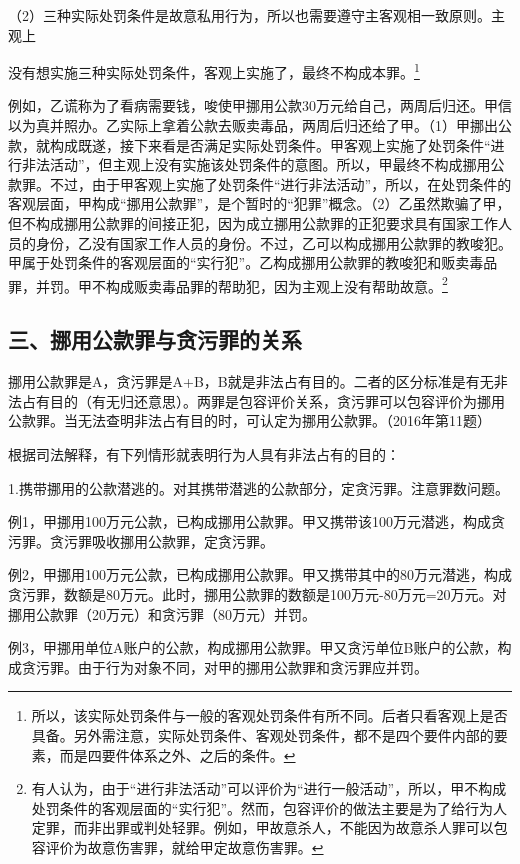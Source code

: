 （2）三种实际处罚条件是故意私用行为，所以也需要遵守主客观相一致原则。主观上

没有想实施三种实际处罚条件，客观上实施了，最终不构成本罪。\footnote{所以，该实际处罚条件与一般的客观处罚条件有所不同。后者只看客观上是否具备。另外需注意，实际处罚条件、客观处罚条件，都不是四个要件内部的要素，而是四要件体系之外、之后的条件。}

例如，乙谎称为了看病需要钱，唆使甲挪用公款30万元给自己，两周后归还。甲信以为真并照办。乙实际上拿着公款去贩卖毒品，两周后归还给了甲。（1）甲挪出公款，就构成既遂，接下来看是否满足实际处罚条件。甲客观上实施了处罚条件“进行非法活动”，但主观上没有实施该处罚条件的意图。所以，甲最终不构成挪用公款罪。不过，由于甲客观上实施了处罚条件“进行非法活动”，所以，在处罚条件的客观层面，甲构成“挪用公款罪”，是个暂时的“犯罪”概念。（2）乙虽然欺骗了甲，但不构成挪用公款罪的间接正犯，因为成立挪用公款罪的正犯要求具有国家工作人员的身份，乙没有国家工作人员的身份。不过，乙可以构成挪用公款罪的教唆犯。甲属于处罚条件的客观层面的“实行犯”。乙构成挪用公款罪的教唆犯和贩卖毒品罪，并罚。甲不构成贩卖毒品罪的帮助犯，因为主观上没有帮助故意。\footnote{有人认为，由于“进行非法活动”可以评价为“进行一般活动”，所以，甲不构成处罚条件的客观层面的“实行犯”。然而，包容评价的做法主要是为了给行为人定罪，而非出罪或判处轻罪。例如，甲故意杀人，不能因为故意杀人罪可以包容评价为故意伤害罪，就给甲定故意伤害罪。}

\subsection*{三、挪用公款罪与贪污罪的关系}

挪用公款罪是A，贪污罪是A+B，B就是非法占有目的。二者的区分标准是有无非法占有目的（有无归还意思）。两罪是包容评价关系，贪污罪可以包容评价为挪用公款罪。当无法查明非法占有目的时，可认定为挪用公款罪。（2016年第11题）

根据司法解释，有下列情形就表明行为人具有非法占有的目的：

1.携带挪用的公款潜逃的。对其携带潜逃的公款部分，定贪污罪。注意罪数问题。

例1，甲挪用100万元公款，已构成挪用公款罪。甲又携带该100万元潜逃，构成贪污罪。贪污罪吸收挪用公款罪，定贪污罪。

例2，甲挪用100万元公款，已构成挪用公款罪。甲又携带其中的80万元潜逃，构成贪污罪，数额是80万元。此时，挪用公款罪的数额是100万元-80万元=20万元。对挪用公款罪（20万元）和贪污罪（80万元）并罚。

例3，甲挪用单位A账户的公款，构成挪用公款罪。甲又贪污单位B账户的公款，构成贪污罪。由于行为对象不同，对甲的挪用公款罪和贪污罪应并罚。

